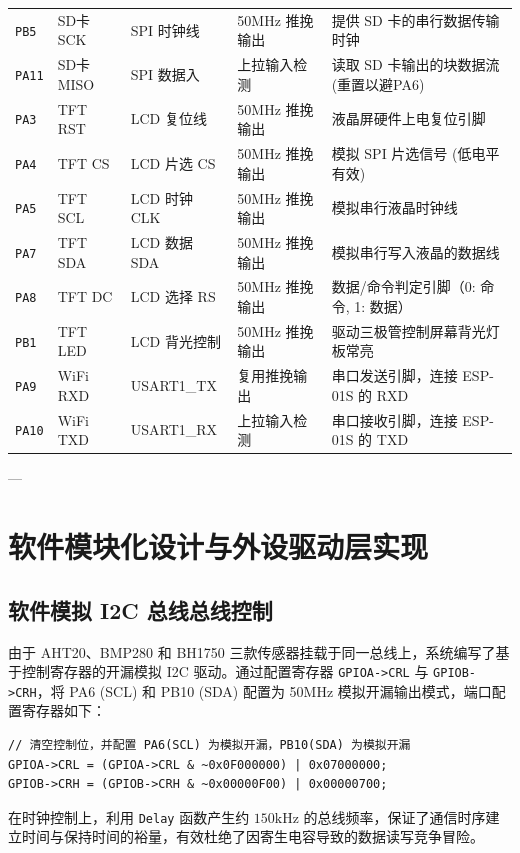 \documentclass[11pt,a4paper]{ctexart}
\begin{document}
\begin{table}[H]
\begin{tabular}{p{2.3cm}p{2.2cm}p{2.3cm}p{3.2cm}p{5.0cm}}
\texttt{PB5} & SD卡 SCK & SPI 时钟线 & 50MHz 推挽输出 & 提供 SD 卡的串行数据传输时钟 \\
\texttt{PA11} & SD卡 MISO & SPI 数据入 & 上拉输入检测 & 读取 SD 卡输出的块数据流 (重置以避PA6) \\
\texttt{PA3} & TFT RST & LCD 复位线 & 50MHz 推挽输出 & 液晶屏硬件上电复位引脚 \\
\texttt{PA4} & TFT CS & LCD 片选 CS & 50MHz 推挽输出 & 模拟 SPI 片选信号 (低电平有效) \\
\texttt{PA5} & TFT SCL & LCD 时钟 CLK & 50MHz 推挽输出 & 模拟串行液晶时钟线 \\
\texttt{PA7} & TFT SDA & LCD 数据 SDA & 50MHz 推挽输出 & 模拟串行写入液晶的数据线 \\
\texttt{PA8} & TFT DC & LCD 选择 RS & 50MHz 推挽输出 & 数据/命令判定引脚（0: 命令, 1: 数据） \\
\texttt{PB1} & TFT LED & LCD 背光控制 & 50MHz 推挽输出 & 驱动三极管控制屏幕背光灯板常亮 \\
\texttt{PA9} & WiFi RXD & USART1\_TX & 复用推挽输出 & 串口发送引脚，连接 ESP-01S 的 RXD \\
\texttt{PA10} & WiFi TXD & USART1\_RX & 上拉输入检测 & 串口接收引脚，连接 ESP-01S 的 TXD \\
\bottomrule
\end{tabular}
\end{table}

---

\section{软件模块化设计与外设驱动层实现}

\subsection{软件模拟 I2C 总线总线控制}
由于 AHT20、BMP280 和 BH1750 三款传感器挂载于同一总线上，系统编写了基于控制寄存器的开漏模拟 I2C 驱动。通过配置寄存器 \texttt{GPIOA->CRL} 与 \texttt{GPIOB->CRH}，将 PA6 (SCL) 和 PB10 (SDA) 配置为 50MHz 模拟开漏输出模式，端口配置寄存器如下：
\begin{lstlisting}[style=cstyle]
// 清空控制位，并配置 PA6(SCL) 为模拟开漏，PB10(SDA) 为模拟开漏
GPIOA->CRL = (GPIOA->CRL & ~0x0F000000) | 0x07000000;
GPIOB->CRH = (GPIOB->CRH & ~0x00000F00) | 0x00000700;
\end{lstlisting}
在时钟控制上，利用 \texttt{Delay} 函数产生约 $150\text{kHz}$ 的总线频率，保证了通信时序建立时间与保持时间的裕量，有效杜绝了因寄生电容导致的数据读写竞争冒险。
\end{document}
